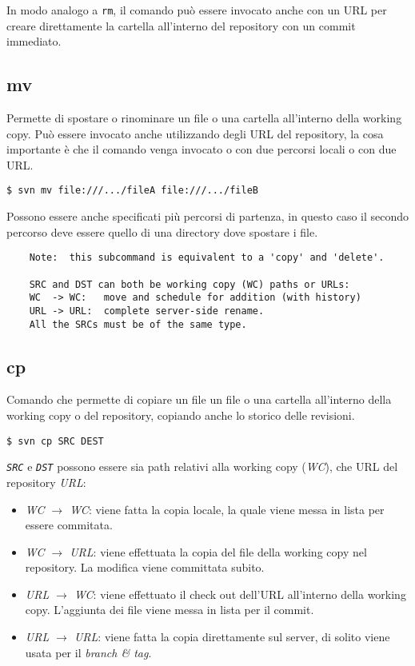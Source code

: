 In modo analogo a \texttt{rm}, il comando può essere invocato anche con un URL per creare direttamente la cartella all'interno del repository con un commit immediato.

\subsection{mv}

Permette di spostare o rinominare un file o una cartella all'interno della working copy. Può essere invocato anche utilizzando degli URL del repository, la cosa importante è che il comando venga invocato o con due percorsi locali o con due URL.

\begin{lstlisting}
$ svn mv file:///.../fileA file:///.../fileB
\end{lstlisting}

Possono essere anche specificati più percorsi di partenza, in questo caso il secondo percorso deve essere quello di una directory dove spostare i file.

\begin{verbatim}
	Note:  this subcommand is equivalent to a 'copy' and 'delete'.
	
	SRC and DST can both be working copy (WC) paths or URLs:
	WC  -> WC:   move and schedule for addition (with history)
	URL -> URL:  complete server-side rename.
	All the SRCs must be of the same type.
\end{verbatim}

\subsection{cp}

Comando che permette di copiare un file un file o una cartella all'interno della working copy o del repository, copiando anche lo storico delle revisioni.

\begin{lstlisting}
$ svn cp SRC DEST
\end{lstlisting}

\textit{\texttt{SRC}} e \textit{\texttt{DST}} possono essere sia path relativi alla working copy (\textit{WC}), che URL del repository \textit{URL}:

\begin{itemize}
	\item \textit{WC $\rightarrow$ WC}: viene fatta la copia locale, la quale viene messa in lista per essere commitata.
	\item \textit{WC $\rightarrow$ URL}: viene effettuata la copia del file della working copy nel repository. La modifica viene committata subito.
	\item \textit{URL $\rightarrow$ WC}: viene effettuato il check out dell'URL all'interno della working copy. L'aggiunta dei file viene messa in lista per il commit.
	\item \textit{URL $\rightarrow$ URL}: viene fatta la copia direttamente sul server, di solito viene usata per il \textit{branch \& tag}.
\end{itemize}

